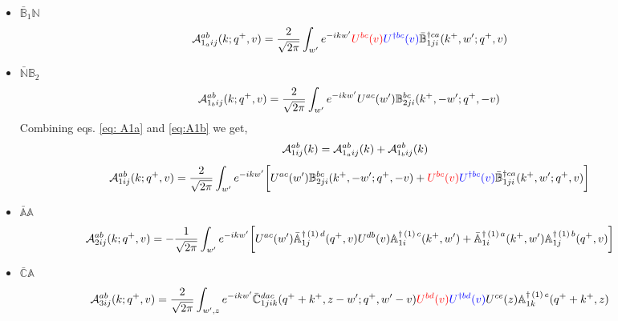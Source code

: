 \documentclass[aps,prd,amsmath,amssymb,nofootinbib]{revtex4-2}
\def\mf#1{\mathbb{#1}}
\numberwithin{equation}{section}
\begin{document}
\begin{itemize}
\item $\bar{\mf{B}}_{1} \mf{N}$
\begin{align}\label{eq: A1a}
    {\cal A}^{ab}_{1_{a}ij}(k; q^{+},v) & = \frac{2}{\sqrt{2\pi}}\int_{w^{\prime}}e^{-i k w^\prime} \textcolor{red}{U^{bc}(v)}\textcolor{blue}{U^{\dagger bc}(v)}\Bar{\mf{B}}^{\dagger ca}_{1ji}(k^{+},w^{\prime};q^{+},v)
\end{align}
 \item $\bar{{\mf{N}}}\mf{B}_{2}$
\begin{align} \label{eq:A1b}
        {\cal A}^{ab}_{1_{b}ij}(k; q^{+},v) & = \frac{2}{\sqrt{2\pi}}  \int_{w^{\prime}}e^{-i k w^\prime}U^{ac}(w^{\prime}) \mf{B}^{bc}_{2ji}(k^{+},-w^{\prime};q^{+},-v)
    \end{align}
Combining eqs. \eqref{eq: A1a} and \eqref{eq:A1b} we get,
$${\cal A}^{ab}_{1ij}(k) = {\cal A}^{ab}_{1_{a}ij}(k) + {\cal A}^{ab}_{1_{b}ij}(k)$$
\begin{align}
     {\cal A}^{ab}_{1ij}(k; q^{+},v) & = \frac{2}{\sqrt{2\pi}} \int_{w^{\prime}}e^{-i k w^\prime}\bigg[U^{ac}(w^{\prime}) \mf{B}^{bc}_{2ji}(k^{+},-w^{\prime};q^{+},-v)+\textcolor{red}{U^{bc}(v)}\textcolor{blue}{U^{\dagger bc}(v)}\Bar{\mf{B}}^{\dagger ca}_{1ji}(k^{+},w^{\prime};q^{+},v)\bigg]
\end{align}
   \item $\bar{{\mf{A}}} \mf{A}$
\begin{align} 
     {\cal A}^{ab}_{2ij}(k; q^{+},v) & = -\frac{1}{\sqrt{2\pi}} \int_{w^{\prime}} e^{-ikw^{\prime}}\bigg[U^{ac}(w^{\prime}) \Bar{\mf{A}}^{\dagger\,(1)\, d}_{1j}(q^{+},v)U^{ db}(v) \mf{A}^{\dagger\,(1)\, c}_{1i}(k^{+},w^{\prime})+\Bar{\mf{A}}^{\dagger\,(1)\, a}_{1i}(k^{+},w^{\prime}) \mf{A}^{\dagger\,(1)\, b}_{1j}(q^{+},v)\bigg] 
\end{align}
\item $\bar{{\mf{C}}} \mf{A}$
    \begin{align}
         {\cal A}^{ab}_{3ij}(k; q^{+},v) & = \frac{2}{\sqrt{2\pi}}  \int_{w^{\prime},z} e^{-i k w^\prime}\Bar{\mf{C}}^{dac}_{1jik}(q^{+}+k^{+},z-w^{\prime}; q^{+},w^{\prime}-v)\textcolor{red}{U^{bd}(v)}\textcolor{blue}{U^{\dagger bd}(v)}U^{ce}(z) \mf{A}^{\dagger\,(1)\,e}_{1k}(q^{+}+k^{+},z)
    \end{align}
\end{itemize}
\end{document}
